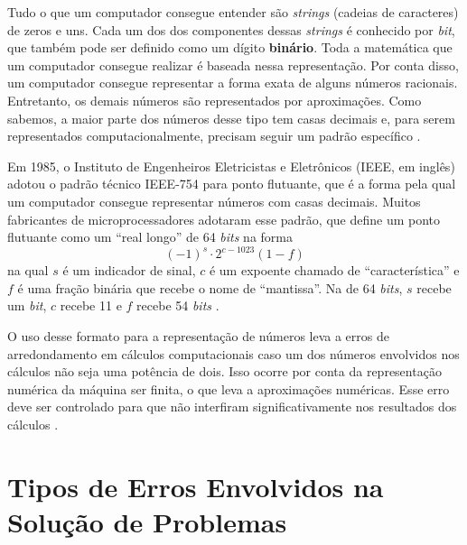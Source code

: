         Tudo o que um computador consegue entender são \textit{strings} (cadeias de caracteres) de zeros e uns. Cada um dos dos componentes dessas \textit{strings} é conhecido por \textit{bit}, que também pode ser definido como um dígito \textbf{binário}. Toda a matemática que um computador consegue realizar é baseada nessa representação. Por conta disso, um computador consegue representar a forma exata de alguns números racionais. Entretanto, os demais números são representados por aproximações. Como sabemos, a maior parte dos números desse tipo tem casas decimais e, para serem representados computacionalmente, precisam seguir um padrão específico \cite{burden}.
        
        Em 1985, o Instituto de Engenheiros Eletricistas e Eletrônicos (IEEE, em inglês) adotou o padrão técnico IEEE-754 para ponto flutuante, que é a forma pela qual um computador consegue representar números com casas decimais. Muitos fabricantes de microprocessadores adotaram esse padrão, que define um ponto flutuante como um ``real longo'' de 64 \textit{bits} na forma 
        \begin{equation*}
            (-1)^s\cdot 2^{c - 1023}(1 - f)
        \end{equation*}
        na qual $s$ é um indicador de sinal, $c$ é um expoente chamado de ``característica'' e $f$ é uma fração binária que recebe o nome de ``mantissa''. Na  de 64 \textit{bits}, $s$ recebe um \textit{bit}, $c$ recebe 11 e $f$ recebe 54 \textit{bits} \cite{burden}.
    
        O uso desse formato para a representação de números leva a erros de arredondamento em cálculos computacionais caso um dos números envolvidos nos cálculos não seja uma potência de dois. Isso ocorre por conta da representação numérica da máquina ser finita, o que leva a aproximações numéricas. Esse erro deve ser controlado para que não interfiram significativamente nos resultados dos cálculos \cite{burden, fred}.
        
    \section{Tipos de Erros Envolvidos na Solução de Problemas}
    
